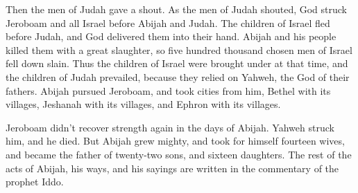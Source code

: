 {Then the men of Judah gave a shout. As the men of Judah shouted, God struck Jeroboam and all Israel before Abijah and Judah.
The children of Israel fled before Judah, and God delivered them into their hand.
Abijah and his people killed them with a great slaughter, so five hundred thousand chosen men of Israel fell down slain.
Thus the children of Israel were brought under at that time, and the children of Judah prevailed, because they relied on Yahweh, the God of their fathers.
Abijah pursued Jeroboam, and took cities from him, Bethel with its villages, Jeshanah with its villages, and Ephron with its villages.
\par }{\PP {}Jeroboam didn’t recover strength again in the days of Abijah. Yahweh struck him, and he died.
But Abijah grew mighty, and took for himself fourteen wives, and became the father of twenty-two sons, and sixteen daughters.
The rest of the acts of Abijah, his ways, and his sayings are written in the commentary of the prophet Iddo.

}
